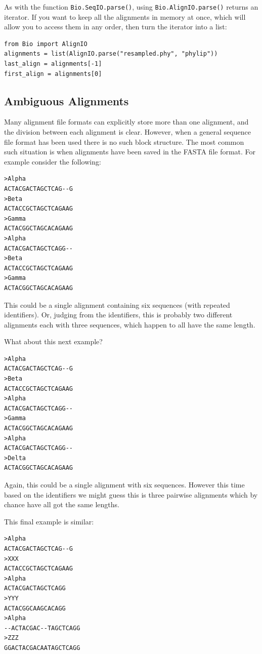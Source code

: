 \documentclass{report}
\begin{document}
As with the function \verb|Bio.SeqIO.parse()|, using \verb|Bio.AlignIO.parse()| returns an iterator.
If you want to keep all the alignments in memory at once, which will allow you to access them in any order, then turn the iterator into a list:

\begin{verbatim}
from Bio import AlignIO
alignments = list(AlignIO.parse("resampled.phy", "phylip"))
last_align = alignments[-1]
first_align = alignments[0]
\end{verbatim}

\subsection{Ambiguous Alignments}
\label{sec:AlignIO-count-argument}
Many alignment file formats can explicitly store more than one alignment, and the division between each alignment is clear.  However, when a general sequence file format has been used there is no such block structure.  The most common such situation is when alignments have been saved in the FASTA file format.  For example consider the following:

\begin{verbatim}
>Alpha
ACTACGACTAGCTCAG--G
>Beta
ACTACCGCTAGCTCAGAAG
>Gamma
ACTACGGCTAGCACAGAAG
>Alpha
ACTACGACTAGCTCAGG--
>Beta
ACTACCGCTAGCTCAGAAG
>Gamma
ACTACGGCTAGCACAGAAG
\end{verbatim}

\noindent This could be a single alignment containing six sequences (with repeated identifiers).  Or, judging from the identifiers, this is probably two different alignments each with three sequences, which happen to all have the same length.

What about this next example?

\begin{verbatim}
>Alpha
ACTACGACTAGCTCAG--G
>Beta
ACTACCGCTAGCTCAGAAG
>Alpha
ACTACGACTAGCTCAGG--
>Gamma
ACTACGGCTAGCACAGAAG
>Alpha
ACTACGACTAGCTCAGG--
>Delta
ACTACGGCTAGCACAGAAG
\end{verbatim}

\noindent Again, this could be a single alignment with six sequences.  However this time based on the identifiers we might guess this is three pairwise alignments which by chance have all got the same lengths.

This final example is similar:

\begin{verbatim}
>Alpha
ACTACGACTAGCTCAG--G
>XXX
ACTACCGCTAGCTCAGAAG
>Alpha
ACTACGACTAGCTCAGG
>YYY
ACTACGGCAAGCACAGG
>Alpha
--ACTACGAC--TAGCTCAGG
>ZZZ
GGACTACGACAATAGCTCAGG
\end{verbatim}
\end{document}
